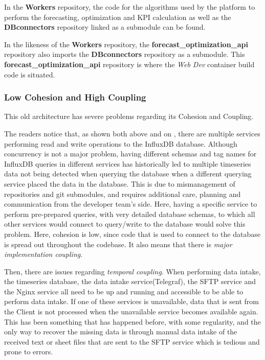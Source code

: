 In the \textbf{Workers} repository, the code for the algorithms used by the platform to perform the forecasting, optimization and KPI calculation as well as the \textbf{DBconnectors} repository linked as a submodule can be found.

In the likeness of the \textbf{Workers} repository, the \textbf{forecast\_optimization\_api} repository also imports the \textbf{DBconnectors} repository as a submodule. This \textbf{forecast\_optimization\_api} repository is where the \textit{Web Dev} container build code is situated. 

\subsubsection{Low Cohesion and High Coupling}\label{methodology:sss:low-cohesion-and-high-coupling}

This old architecture has severe problems regarding its Cohesion and Coupling.

The readers notice that, as shown both above and on , there are multiple services performing read and write operations to the InfluxDB database. Although concurrency is not a major problem, having different schemas and tag names for InfluxDB queries in different services has historically led to multiple timeseries data not being detected when querying the database when a different querying service placed the data in the database. This is due to mismanagement of repositories and git submodules, and requires additional care, planning and communication from the developer team's side. Here, having a specific service to perform pre-prepared queries, with very detailed database schemas, to which all other services would connect to query/write to the database would solve this problem. Here, cohesion is low, since code that is used to connect to the database is spread out throughout the codebase. It also means that there is \textit{major implementation coupling}.

Then, there are issues regarding \textit{temporal coupling}. When performing data intake, the timeseries database, the data intake service(Telegraf), the SFTP service and the Nginx service all need to be up and running and accessible to be able to perform data intake. If one of these services is unavailable, data that is sent from the Client is not processed when the unavailable service becomes available again. This has been something that has happened before, with some regularity, and the only way to recover the missing data is through manual data intake of the received text or sheet files that are sent to the SFTP service which is tedious and prone to errors.

